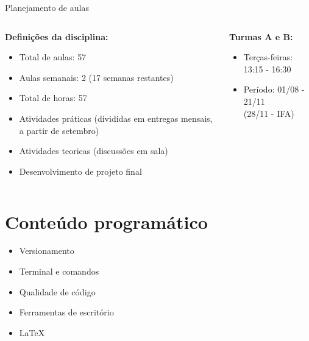 \documentclass{beamer}
\begin{document}
\begin{frame}[fragile]{Planejamento de aulas}
      \begin{columns}
            \begin{column}{0.5\textwidth}
                  \textbf{Definições da disciplina:}
                  \begin{itemize}
                        \item Total de aulas: 57 
                        \item Aulas semanais: 2 (17 semanas restantes)
                        \item Total de horas: 57
                        \item Atividades práticas (divididas em entregas mensais, a partir de setembro)
                        \item Atividades teoricas (discussões em sala)
                        \item Desenvolvimento de projeto final
      
                  \end{itemize}


            \end{column}
            \begin{column}{0.6\textwidth}
                  \begin{column}{0.6\textwidth}
                        \textbf{Turmas A e B: }
                        \begin{itemize}
                              \item Terças-feiras: 13:15 - 16:30
                              \item Período: 01/08 - 21/11 \\ (28/11 - IFA)
                        \end{itemize}
                        
                  \end{column}
                  
            \end{column}
      \end{columns}
\end{frame}


\section{Conteúdo programático}

\begin{frame}
      \begin{itemize}
            \item Versionamento
            \item Terminal e comandos
            \item Qualidade de código
            \item Ferramentas de escritório
            \item LaTeX
      \end{itemize}
\end{frame}
\end{document}
